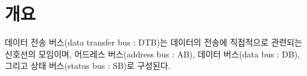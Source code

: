 %
%
\section{개요}
데이터 전송 버스(data transfer bus : DTB)는 데이터의 전송에 직접적으로 관련되는 신호선의 모임이며,
어드레스 버스(address bus : AB), 데이터 버스(data bus : DB),
그리고 상태 버스(status bus : SB)로 구성된다.

%
%
